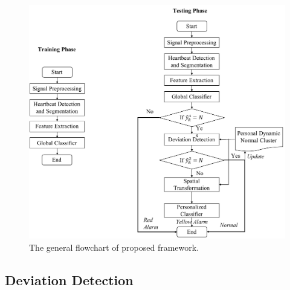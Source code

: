 \begin{figure}[ht]
	\centering
	\includegraphics[scale=.5]{Fig/flow_thesis.pdf}
	\caption{The general flowchart of proposed framework.}
	\label{fig:flow}
\end{figure}


\subsection{Deviation Detection}

